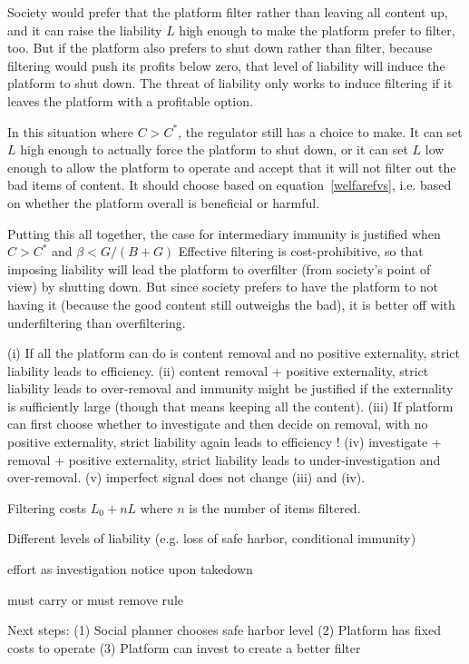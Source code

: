 Society would prefer that the platform filter rather than leaving all content up, and it can raise the liability $L$ high enough to make the platform prefer to filter, too. But if the platform also prefers to shut down rather than filter, because filtering would push its profits below zero, that level of liability will induce the platform to shut down. The threat of liability only works to induce filtering if it leaves the platform with a profitable option. 

In this situation where $C > C^*$, the regulator still has a choice to make. It can set $L$ high enough to actually force the platform to shut down, or it can set $L$ low enough to allow the platform to operate and accept that it will not filter out the bad items of content. It should choose based on equation~\ref{welfarefvs}, i.e. based on whether the platform overall is beneficial or harmful.

Putting this all together, the case for intermediary immunity is justified when $C > C^*$ and $\beta < G/(B+G)$ Effective filtering is cost-prohibitive, so that imposing liability will lead the platform to overfilter (from society's point of view) by shutting down. But since society prefers to have the platform to not having it (because the good content still outweighs the bad), it is better off with underfiltering than overfiltering.


\fi



(i) If all the platform can do is content removal and no positive externality, strict liability leads to efficiency.
(ii) content removal + positive externality, strict liability leads to over-removal and immunity might be justified if the externality is sufficiently large (though that means keeping all the content).
(iii) If platform can first choose whether to investigate and then decide on removal, with no positive externality, strict liability again leads to efficiency !
(iv) investigate + removal + positive externality, strict liability leads to under-investigation and over-removal.  
(v) imperfect signal does not change (iii) and (iv). 




Filtering costs $L_0 + nL$ where $n$ is the number of items filtered.







Different levels of liability (e.g. loss of safe harbor, conditional immunity)


effort as investigation 
notice upon takedown

must carry or must remove rule

Next steps:
(1) Social planner chooses safe harbor level
(2) Platform has fixed costs to operate
(3) Platform can invest to create a better filter